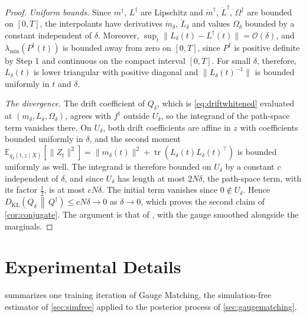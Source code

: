 \documentclass{article} %
\newcommand{\postdrift}{f}
\newcommand{\obs}{X}
\newcommand{\gauge}{\Omega}
\newcommand{\tr}{\operatorname{tr}}
\newcommand{\KL}[2]{D_{\mathrm{KL}}\left(#1 \,\middle\|\, #2\right)}
\newcommand{\E}{\mathbb{E}}
\begin{document}
\begin{proof}
\emph{Uniform bounds.} Since $m^\dagger$, $L^\dagger$ are Lipschitz and $\dot m^\dagger$, $\dot L^\dagger$, $\gauge^\dagger$ are bounded on $[0, T]$, the interpolants have derivatives $\dot m_\delta$, $\dot L_\delta$ and values $\gauge_\delta$ bounded by a constant independent of $\delta$. Moreover, $\sup_t \| L_\delta(t) - L^\dagger(t) \| = \mathcal{O}(\delta)$, and $\lambda_{\min}(P^\dagger(t))$ is bounded away from zero on $[0, T]$, since $P^\dagger$ is positive definite by Step 1 and continuous on the compact interval $[0, T]$. For small $\delta$, therefore, $L_\delta(t)$ is lower triangular with positive diagonal and $\| L_\delta(t)^{-1} \|$ is bounded uniformly in $t$ and $\delta$.

\emph{The divergence.} The drift coefficient of $Q_\delta$, which is \cref{eq:driftwhitened} evaluated at $(m_\delta, L_\delta, \gauge_\delta)$, agrees with $\postdrift^\dagger$ outside $U_\delta$, so the integrand of the path-space term vanishes there. On $U_\delta$, both drift coefficients are affine in $z$ with coefficients bounded uniformly in $\delta$, and the second moment $\E_{q_\delta(t, z \mid \obs)}[\| Z_t \|^2] = \| m_\delta(t) \|^2 + \tr(L_\delta(t) L_\delta(t)^\top)$ is bounded uniformly as well. The integrand is therefore bounded on $U_\delta$ by a constant $c$ independent of $\delta$, and since $U_\delta$ has length at most $2 N \delta$, the path-space term, with its factor $\frac{1}{2}$, is at most $c N \delta$. The initial term vanishes since $0 \notin U_\delta$. Hence $\KL{Q_\delta}{Q^\dagger} \le c N \delta \to 0$ as $\delta \to 0$, which proves the second claim of \cref{cor:conjugate}. The argument is that of \citet[Theorem 1]{smith2026closing}, with the gauge smoothed alongside the marginals.
\end{proof}

\section{Experimental Details}\label{sec:expdetails}

 summarizes one training iteration of Gauge Matching, the simulation-free estimator of \cref{sec:simfree} applied to the posterior process of \cref{sec:gaugematching}.
\end{document}

